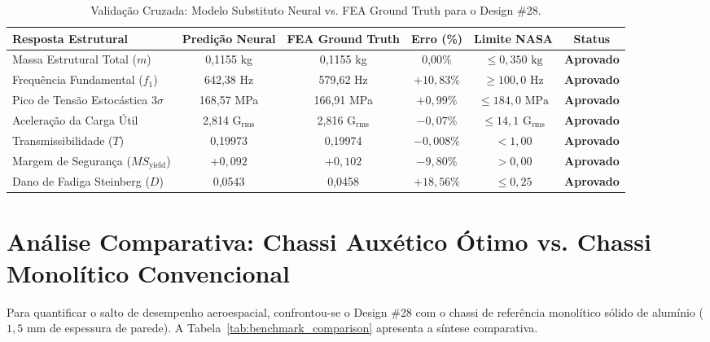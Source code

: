 \documentclass[12pt,a4paper]{report}
\begin{document}
\begin{table}[H]
\centering
\caption{Validação Cruzada: Modelo Substituto Neural vs. FEA Ground Truth para o Design \#28.}
\label{tab:fea_validation}
\begin{tabular}{lccccc}
\toprule
\textbf{Resposta Estrutural} & \textbf{Predição Neural} & \textbf{FEA Ground Truth} & \textbf{Erro (\%)} & \textbf{Limite NASA} & \textbf{Status} \\
\midrule
Massa Estrutural Total ($m$) & 0,1155 kg & 0,1155 kg & 0,00\% & $\le 0{,}350\text{ kg}$ & \textbf{Aprovado} \\
Frequência Fundamental ($f_1$) & 642,38 Hz & 579,62 Hz & $+10{,}83\%$ & $\ge 100{,}0\text{ Hz}$ & \textbf{Aprovado} \\
Pico de Tensão Estocástica $3\sigma$ & 168,57 MPa & 166,91 MPa & $+0{,}99\%$ & $\le 184{,}0\text{ MPa}$ & \textbf{Aprovado} \\
Aceleração da Carga Útil & 2,814 G$_{\text{rms}}$ & 2,816 G$_{\text{rms}}$ & $-0{,}07\%$ & $\le 14{,}1\text{ G}_{\text{rms}}$ & \textbf{Aprovado} \\
Transmissibilidade ($T$) & 0,19973 & 0,19974 & $-0{,}008\%$ & $< 1{,}00$ & \textbf{Aprovado} \\
Margem de Segurança ($MS_{\text{yield}}$) & $+0{,}092$ & $+0{,}102$ & $-9{,}80\%$ & $> 0{,}00$ & \textbf{Aprovado} \\
Dano de Fadiga Steinberg ($D$) & 0,0543 & 0,0458 & $+18{,}56\%$ & $\le 0{,}25$ & \textbf{Aprovado} \\
\bottomrule
\end{tabular}
\end{table}

\section{Análise Comparativa: Chassi Auxético Ótimo vs. Chassi Monolítico Convencional}
Para quantificar o salto de desempenho aeroespacial, confrontou-se o Design \#28 com o chassi de referência monolítico sólido de alumínio ($1{,}5\text{ mm}$ de espessura de parede). A Tabela~\ref{tab:benchmark_comparison} apresenta a síntese comparativa.
\end{document}
